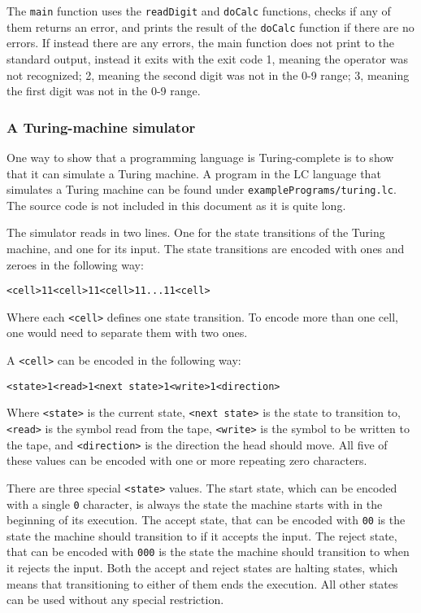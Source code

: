 \documentclass[12pt]{article}
\begin{document}
The \verb$main$ function uses the \verb$readDigit$ and \verb$doCalc$ functions,
checks if any of them returns an error, and prints the result of the
\verb$doCalc$ function if there are no errors. If instead there are any errors,
the main function does not print to the standard output, instead it exits with
the exit code 1, meaning the operator was not recognized; 2, meaning the second
digit was not in the 0-9 range; 3, meaning the first digit was not in the 0-9
range.

\subsubsection{A Turing-machine simulator}

One way to show that a programming language is Turing-complete is to show that
it can simulate a Turing machine. A program in the LC language that simulates a
Turing machine can be found under \verb$examplePrograms/turing.lc$. The source
code is not included in this document as it is quite long.

The simulator reads in two lines. One for the state transitions of the Turing
machine, and one for its input. The state transitions are encoded with ones and
zeroes in the following way:
\lstset{frame=none}
\lstset{numbers=none}
\begin{lstlisting}
<cell>11<cell>11<cell>11...11<cell>
\end{lstlisting}
Where each \verb$<cell>$ defines one state transition. To encode more than one
cell, one would need to separate them with two ones.

A \verb$<cell>$ can be encoded in the following way:
\begin{lstlisting}
<state>1<read>1<next state>1<write>1<direction>
\end{lstlisting}
Where \verb$<state>$ is the current state, \verb$<next state>$ is the state to
transition to, \verb$<read>$ is the symbol read from the tape, \verb$<write>$ is
the symbol to be written to the tape, and \verb$<direction>$ is the direction
the head should move. All five of these values can be encoded with one or more
repeating zero characters.

There are three special \verb$<state>$ values. The start state, which can be
encoded with a single \verb$0$ character, is always the state the machine starts
with in the beginning of its execution. The accept state, that can be encoded
with \verb$00$ is the state the machine should transition to if it accepts the
input. The reject state, that can be encoded with \verb$000$ is the state the
machine should transition to when it rejects the input. Both the accept and
reject states are halting states, which means that transitioning to either of
them ends the execution. All other states can be used without any special 
restriction.
\end{document}
